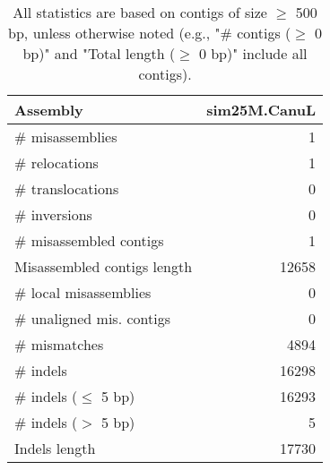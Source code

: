 \documentclass[12pt,a4paper]{article}
\begin{document}
\begin{table}[ht]
\begin{center}
\caption{All statistics are based on contigs of size $\geq$ 500 bp, unless otherwise noted (e.g., "\# contigs ($\geq$ 0 bp)" and "Total length ($\geq$ 0 bp)" include all contigs).}
\begin{tabular}{|l*{1}{|r}|}
\hline
Assembly & sim25M.CanuL \\ \hline
\# misassemblies & 1 \\ \hline
\hspace{5mm}\# relocations & 1 \\ \hline
\hspace{5mm}\# translocations & 0 \\ \hline
\hspace{5mm}\# inversions & 0 \\ \hline
\# misassembled contigs & 1 \\ \hline
Misassembled contigs length & 12658 \\ \hline
\# local misassemblies & 0 \\ \hline
\# unaligned mis. contigs & 0 \\ \hline
\# mismatches & 4894 \\ \hline
\# indels & 16298 \\ \hline
\hspace{5mm}\# indels ($\leq$ 5 bp) & 16293 \\ \hline
\hspace{5mm}\# indels ($>$ 5 bp) & 5 \\ \hline
Indels length & 17730 \\ \hline
\end{tabular}
\end{center}
\end{table}
\end{document}
